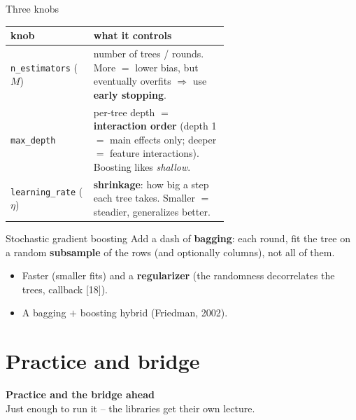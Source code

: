 \documentclass[aspectratio=169]{beamer}
\newcommand{\sectiontransition}[2]{%
  \begin{frame}[plain]
    \vfill
    \begin{center}
      {\Large\color{popblue}\textbf{#1}}\\[10pt]
      {\normalsize #2}
    \end{center}
    \vfill
  \end{frame}}
\begin{document}
\begin{frame}{Three knobs}
  \begin{center}\footnotesize
    \renewcommand{\arraystretch}{1.25}
    \begin{tabular}{l p{0.62\linewidth}}
      knob & what it controls \\
      \hline
      \texttt{n\_estimators} ($M$) & number of trees / rounds. More $=$ lower bias, but
        eventually overfits $\Rightarrow$ use \textbf{early stopping}. \\
      \texttt{max\_depth} & per-tree depth $=$ \textbf{interaction order} (depth 1 $=$ main
        effects only; deeper $=$ feature interactions). Boosting likes \emph{shallow}. \\
      \texttt{learning\_rate} ($\eta$) & \textbf{shrinkage}: how big a step each tree takes.
        Smaller $=$ steadier, generalizes better. \\
      \hline
    \end{tabular}
  \end{center}
  \vfill
\end{frame}

\begin{frame}{Stochastic gradient boosting}
  Add a dash of \textbf{bagging}: each round, fit the tree on a random \textbf{subsample}
  of the rows (and optionally columns), not all of them.
  \begin{itemize}\small
    \item Faster (smaller fits) and a \textbf{regularizer} (the randomness decorrelates
      the trees, callback [18]).
    \item A bagging $+$ boosting hybrid (Friedman, 2002).
  \end{itemize}
  \vfill
\end{frame}

\section{Practice and bridge}
\sectiontransition{Practice and the bridge ahead}{Just enough to run it -- the libraries get their own lecture.}
\end{document}

